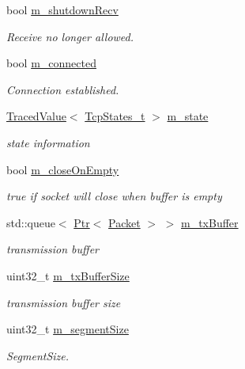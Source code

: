 \begin{DoxyCompactItemize}
bool \hyperlink{classns3_1_1NscTcpSocketImpl_acc152ea66a20478c1f222a4f0862e026}{m\+\_\+shutdown\+Recv}
\begin{DoxyCompactList}\small\item\em Receive no longer allowed. \end{DoxyCompactList}\item 
bool \hyperlink{classns3_1_1NscTcpSocketImpl_a44d10189d15f158179fb5b8849001244}{m\+\_\+connected}
\begin{DoxyCompactList}\small\item\em Connection established. \end{DoxyCompactList}\item 
\hyperlink{classns3_1_1TracedValue}{Traced\+Value}$<$ \hyperlink{group__tcp_ga3929cdb47bdf159657fa24054aa5ca03}{Tcp\+States\+\_\+t} $>$ \hyperlink{classns3_1_1NscTcpSocketImpl_aa60a97fe06f4b74ed57101a297d6216c}{m\+\_\+state}
\begin{DoxyCompactList}\small\item\em state information \end{DoxyCompactList}\item 
bool \hyperlink{classns3_1_1NscTcpSocketImpl_a542de48d71ff4a6b363ef6b74a24312d}{m\+\_\+close\+On\+Empty}
\begin{DoxyCompactList}\small\item\em true if socket will close when buffer is empty \end{DoxyCompactList}\item 
std\+::queue$<$ \hyperlink{classns3_1_1Ptr}{Ptr}$<$ \hyperlink{classns3_1_1Packet}{Packet} $>$ $>$ \hyperlink{classns3_1_1NscTcpSocketImpl_ac39f7bbdc24d72c54744db1943d927dd}{m\+\_\+tx\+Buffer}
\begin{DoxyCompactList}\small\item\em transmission buffer \end{DoxyCompactList}\item 
uint32\+\_\+t \hyperlink{classns3_1_1NscTcpSocketImpl_a0adc703cbdbc880fb7ddbd587abc3aa8}{m\+\_\+tx\+Buffer\+Size}
\begin{DoxyCompactList}\small\item\em transmission buffer size \end{DoxyCompactList}\item 
uint32\+\_\+t \hyperlink{classns3_1_1NscTcpSocketImpl_af89a595fba2c7247c55c82947de87ec3}{m\+\_\+segment\+Size}
\begin{DoxyCompactList}\small\item\em Segment\+Size. \end{DoxyCompactList}\item 

\end{DoxyCompactItemize}
